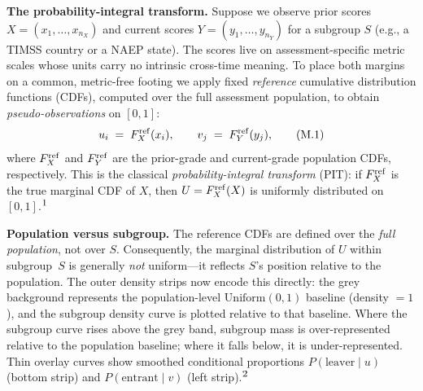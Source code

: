 \documentclass[10pt]{article}
\begin{document}
\noindent
\begin{minipage}[t]{7.8in}
  \vspace{0.1in}
  \hspace{0.2in}%
  \begin{minipage}{7.4in}
    \small\raggedright\color{bodyGrey}

    \textbf{The probability-integral transform.}\enspace
    Suppose we observe prior scores $X = (x_1,\dots,x_{n_X})$ and current scores
    $Y = (y_1,\dots,y_{n_Y})$ for a subgroup $S$ (e.g., a TIMSS country or a
    NAEP state). The scores live on assessment-specific metric scales whose
    units carry no intrinsic cross-time meaning. To place both margins on a
    common, metric-free footing we apply fixed \emph{reference} cumulative
    distribution functions (CDFs), computed over the full assessment population,
    to obtain \emph{pseudo-observations} on $[0,1]$:
    \begin{equation}
      u_i \;=\; F_X^{\mathrm{ref}}(x_i),
      \qquad
      v_j \;=\; F_Y^{\mathrm{ref}}(y_j),
      \tag{M.1}
    \end{equation}
    where $F_X^{\mathrm{ref}}$ and $F_Y^{\mathrm{ref}}$ are the prior-grade and current-grade population CDFs,
    respectively. This is the classical \emph{probability-integral transform} (PIT):
    if $F_X^{\mathrm{ref}}$ is the true marginal CDF of $X$, then $U = F_X^{\mathrm{ref}}(X)$ is uniformly
    distributed on $[0,1]$.$^{\mbox{\footnotesize{1}}}$

    \vspace{6pt}
    \textbf{Population versus subgroup.}\enspace
    The reference CDFs are defined over the \emph{full population}, not over $S$.
    Consequently, the marginal distribution of $U$ within subgroup~$S$ is
    generally \emph{not} uniform---it reflects $S$'s position relative to the
    population. The outer density strips now encode this directly: the grey
    background represents the population-level $\mathrm{Uniform}(0,1)$ baseline
    (density $=1$), and the subgroup density curve is plotted relative to that
    baseline. Where the subgroup curve rises above the grey band, subgroup mass
    is over-represented relative to the population baseline; where it falls
    below, it is under-represented. Thin overlay curves show smoothed conditional
    proportions $P(\text{leaver}\mid u)$ (bottom strip) and
    $P(\text{entrant}\mid v)$ (left strip).$^{\mbox{\footnotesize{2}}}$


\end{minipage}
\end{minipage}
\end{document}
